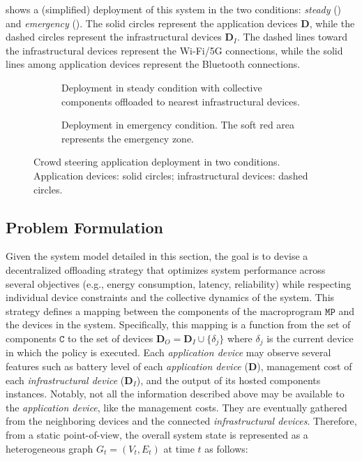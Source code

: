  shows a (simplified) deployment of this system in the two conditions:
 \emph{steady} () and \emph{emergency} ().
%
The solid circles represent the application devices $\mathbf{D}$,
 while the dashed circles represent the infrastructural devices $\mathbf{D}_I$.
%
The dashed lines toward the infrastructural devices represent the Wi-Fi/5G connections,
 while the solid lines among application devices represent the Bluetooth connections.

\begin{figure}
  \centering
  \begin{subfigure}{0.45\textwidth}
    \centering
    \def\svgwidth{0.7\textwidth}\footnotesize
    
    \caption{Deployment in steady condition with collective components offloaded to nearest infrastructural devices.}
    \label{fig:deployment-steady}
  \end{subfigure}
  \hfill
  \begin{subfigure}{0.45\textwidth}
      \centering
      \def\svgwidth{0.7\textwidth}\footnotesize
      
      \caption{Deployment in emergency condition. The soft red area represents the emergency zone.}
      \label{fig:deployment-emergency}
  \end{subfigure}
  \caption{\label{fig:deployment-model}
    Crowd steering application deployment in two conditions.
    Application devices: solid circles; infrastructural devices: dashed circles.}
  \label{fig:application-infrastructural-devices}
\end{figure}

\subsection{Problem Formulation}
Given the system model detailed in this section, 
 the goal is to devise a decentralized offloading strategy that optimizes system performance across several objectives (e.g., energy consumption, latency, reliability) while respecting individual device constraints and the collective dynamics of the system.
%
This strategy defines a mapping between the components of the macroprogram $\mathtt{MP}$ and the devices in the system.
%
Specifically,
 this mapping is a function from the set of components $\mathtt{C}$ to the set of devices $\mathbf{D}_O = \mathbf{D}_I \cup \{\delta_j\}$
 where $\delta_j$ is the current device in which the policy is executed.
%
Each \emph{application device} may observe several features such as 
 battery level of each \emph{application device} ($\mathbf{D}$),
 management cost of each \emph{infrastructural device} ($\mathbf{D}_I$),
 and the output of its hosted components instances.
%
Notably,
 not all the information described above may be available to the \emph{application device},
 like the management costs.
%
They are eventually gathered from the neighboring devices and the connected \emph{infrastructural devices}.
%
Therefore,
 from a static point-of-view,
 the overall system state is represented as a heterogeneous graph $G_t = (V_t, E_t)$ at time $t$ as follows:

